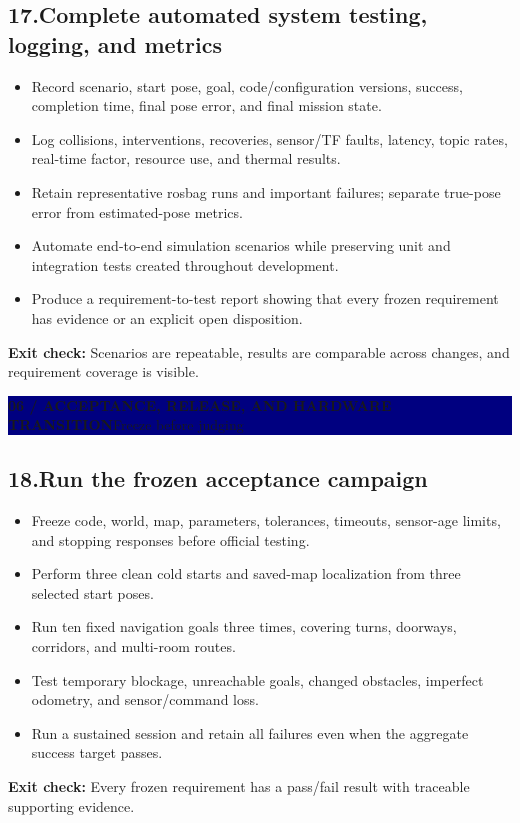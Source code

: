 \documentclass[10pt,a4paper]{article}
\newcommand{\cb}{\(\square\)}
\newcommand{\exitcheck}[1]{\vspace{2pt}\colorbox{PaleTeal}{\parbox{0.965\linewidth}{\textbf{Exit check:} #1}}}
\newcommand{\workstep}[2]{\subsection{\texorpdfstring{#1\quad #2}{#1\ #2}}}
\newcommand{\stagebanner}[2]{%
  \vspace{2pt}
  \noindent\colorbox{Navy}{\parbox{0.965\linewidth}{\color{white}\textbf{#1}\hfill #2}}
  \vspace{2pt}
}
\begin{document}
\workstep{17.}{Complete automated system testing, logging, and metrics}
\begin{itemize}
  \item[\cb] Record scenario, start pose, goal, code/configuration versions, success, completion time, final pose error, and final mission state.
  \item[\cb] Log collisions, interventions, recoveries, sensor/TF faults, latency, topic rates, real-time factor, resource use, and thermal results.
  \item[\cb] Retain representative rosbag runs and important failures; separate true-pose error from estimated-pose metrics.
  \item[\cb] Automate end-to-end simulation scenarios while preserving unit and integration tests created throughout development.
  \item[\cb] Produce a requirement-to-test report showing that every frozen requirement has evidence or an explicit open disposition.
\end{itemize}
\exitcheck{Scenarios are repeatable, results are comparable across changes, and requirement coverage is visible.}

\newpage
\stagebanner{06 / ACCEPTANCE, RELEASE, AND HARDWARE TRANSITION}{Freeze before judging}

\workstep{18.}{Run the frozen acceptance campaign}
\begin{itemize}
  \item[\cb] Freeze code, world, map, parameters, tolerances, timeouts, sensor-age limits, and stopping responses before official testing.
  \item[\cb] Perform three clean cold starts and saved-map localization from three selected start poses.
  \item[\cb] Run ten fixed navigation goals three times, covering turns, doorways, corridors, and multi-room routes.
  \item[\cb] Test temporary blockage, unreachable goals, changed obstacles, imperfect odometry, and sensor/command loss.
  \item[\cb] Run a sustained session and retain all failures even when the aggregate success target passes.
\end{itemize}
\exitcheck{Every frozen requirement has a pass/fail result with traceable supporting evidence.}
\end{document}
